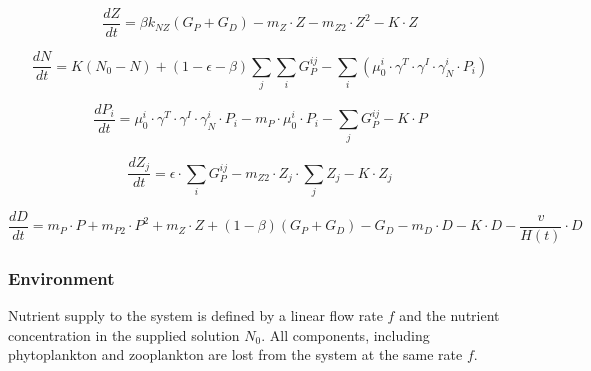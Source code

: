 \documentclass[template.tex]{subfiles}
\begin{document}
\begin{equation}
    \frac{d Z}{d t} =
    \beta k_{NZ}(G_P + G_D) %
    - m_Z \cdot Z %
    - m_{Z2} \cdot Z^2 %
    - K \cdot Z %
    
\end{equation}



\begin{equation}
    \frac{d N}{d t} = 
    K (N_0 - N) %
    + (1 - \epsilon - \beta)\sum_{j} \sum_{i} G^{ij}_P %
    - \sum_{i} ( \mu^i_{0} \cdot \gamma^{T} \cdot \gamma^{I} \cdot \gamma^i_N \cdot P_i) %
\end{equation}

\begin{equation}
    \frac{d P_i}{d t} =
    \mu^i_{0} \cdot \gamma^{T} \cdot \gamma^{I} \cdot \gamma^i_N \cdot   P_i  %
    - m_P  \cdot \mu^i_{0} \cdot P_i %
    - \sum_{j} G^{ij}_P %
    - K \cdot P %
\end{equation}

\begin{equation}
    \frac{d Z_j}{d t} =
    \epsilon \cdot \sum_{i} G^{ij}_P %
    - m_{Z2} \cdot Z_j \cdot \sum_{j} Z_j  %
    - K \cdot Z_j %
\end{equation}

\begin{equation}
    \frac{d D}{d t} = 
    m_P \cdot P %
    + m_{P2} \cdot P^2 %
    + m_Z \cdot Z %
    + (1 - \beta)(G_P + G_D) %
    - G_D %
    - m_D \cdot D %
    - K \cdot D %
    - \frac{v}{H(t)} \cdot D %
\end{equation}


\subsubsection{Environment}

Nutrient supply to the system is defined by a linear flow rate $f$ and the nutrient concentration in the supplied solution $N_0$. All components, including phytoplankton and zooplankton are lost from the system at the same rate $f$.
\end{document}
